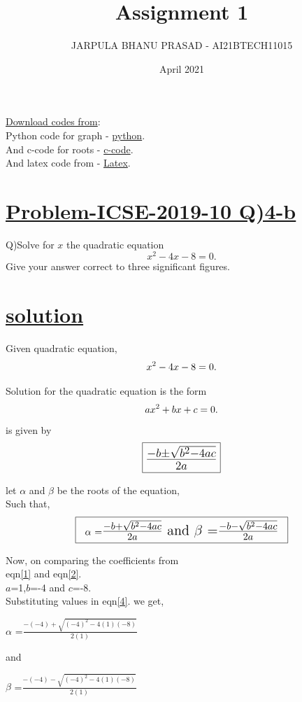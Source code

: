 \documentclass[journal,12pt,twocolumn]{IEEEtran}
\title{Assignment 1}
\author{JARPULA BHANU PRASAD - AI21BTECH11015	}
\date{April 2021}
\begin{document}
\maketitle
\Large \underline{Download codes from}:\\
\large Python code for graph - \href{https://github.com/jarpula-Bhanu/Assinment-1/blob/main/quardratic.py}{python}.\\And c-code for roots -  \href{https://github.com/jarpula-Bhanu/Assinment-1/blob/main/roots.c}{c-code}.\\And latex code from - \href{https://github.com/jarpula-Bhanu/Assinment-1/blob/main/Assignment_1.tex}{Latex}.

\section{\Large \underline{Problem-ICSE-2019-10  Q)4-b}}
\large \noindent Q)Solve for $x$ the quadratic equation $$x^2-4x-8=0.$$ Give your answer correct to three significant figures.
\section{\large \underline{solution}}
Given quadratic equation,
\begin{align} \label{1}
\large x^2-4x-8=0.
\end{align}

\noindent Solution for the quadratic equation is the form 
\begin{align} \label{2}
 \large ax^2+bx+c=0.
\end{align} 
 is given by 
\begin{align} \label{3}
\framebox[1.1\width]{\LARGE $\frac{-b\pm\sqrt{b^2-4ac}}{2a}$}
\end{align}

let $\alpha$ and $\beta$ be the roots of the equation,\\Such that,
\begin{align} \label{4}
\framebox[1.1\width]{$\alpha$ =\Large $\frac{-b+\sqrt{b^2-4ac}}{2a}$ and  $\beta$ =\Large $\frac{-b-\sqrt{b^2-4ac}}{2a}$}
\end{align}

Now, on comparing the coefficients from 
\\eqn\eqref{1} and eqn\eqref{2}.
\\\large $a$=1,\large $b$=-4 and \large $c$=-8.
\\Substituting values in eqn\eqref{4}. we get,
\begin{center}
$\alpha$ =\Large $\frac{-(-4)+\sqrt{(-4)^2-4(1)(-8)}}{2(1)}$
\end{center}
and
\begin{center}
$\beta$ =\Large $\frac{-(-4)-\sqrt{(-4)^2-4(1)(-8)}}{2(1)}$
\end{center}
\end{document}
